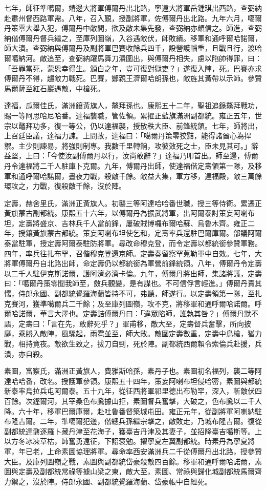 \begin{pinyinscope}
七年，師征準噶爾，靖邊大將軍傅爾丹出北路，寧遠大將軍岳鍾琪出西路，查弼納赴肅州督西路軍需。八年，召入覲，授副將軍，佐傅爾丹出北路。九年六月，噶爾丹策零大舉入犯，傅爾丹中敵間，欲及敵未集先發，查弼納亦頗信之。師進，查弼納偕傅爾丹督兵繼之，至庫列圖嶺，入谷遇敵伏，師敗績。移軍和通呼爾哈諾爾，師大潰。查弼納與傅爾丹及副將軍巴賽收餘兵四千，設營護輜重，且戰且行，渡哈爾噶納河。敵追至，查弼納躍馬舞刀潰圍出，與傅爾丹相失，慮以陷帥得罪，曰：「吾罪當死，蒙恩幸得生。頒白之年，豈可復對獄吏？」遂復入陣，死。巴賽亦求傅爾丹不得，趨敵力戰死。巴賽，鄭親王濟爾哈朗孫也，敵旌其黃帶以示師。參贊馬爾薩至紅石巖遇敵，中槍死。

達福，瓜爾佳氏，滿洲鑲黃旗人，鼇拜孫也。康熙五十二年，聖祖追錄鼇拜戰功，賜一等阿思哈尼哈番。達福襲職，管佐領。累擢正藍旗滿洲副都統。雍正五年，世宗以鼇拜功多，復一等公，仍以達福襲，授散秩大臣、前鋒統領。七年，師將出，上召廷臣議，達福力諫。上問故，達福曰：「噶爾丹策零狡黠，能得諸酋心為捍禦。主少則諫易，將強則制專。我數千里轉餉，攻彼效死之士，臣未見其可。」辭益堅，上曰：「今使汝副傅爾丹以行，汝尚敢辭？」達福乃叩首出。師至邊，傅爾丹令達福將二千人駐庫卜克爾。九年，傅爾丹出師，使達福偕定壽領第一隊，及移軍和通呼爾哈諾爾，晝夜力戰，殺敵千餘。敵益大集，軍方移，達福殿，敵三萬餘環攻之，力戰，復殺敵千餘，沒於陣。

定壽，赫舍里氏，滿洲正黃旗人。初襲三等阿達哈哈番世職，授三等侍衛。累遷正黃旗蒙古副都統。康熙五十六年，以傅爾丹為振武將軍，出阿爾泰討策妄阿喇布坦，定壽將盛京、吉林兵千人當前鋒，屢破賊博囉布爾哈蘇、烏魯木齊。雍正二年，授鑲黃旗蒙古都統。策妄阿喇布坦使乞和，定壽率兵還駐巴爾庫爾。部議阿爾泰當駐軍，授定壽阿爾泰駐防將軍。尋改命穆克登，而令定壽以都統銜參贊軍務。四年，率兵往扎布罕，召偕穆克登還京師。定壽奏留察罕蒐勒軍中自效。七年，大將軍傅爾丹自北路出師，命定壽仍以都統銜為軍營前鋒統領。八年，傅爾丹令定壽以二千人駐伊克斯諾爾，護阿濟必濟卡倫。九年，傅爾丹將出師，集諸將議，定壽曰：「噶爾丹策零聞我師至，斂兵觀變，是有謀也。不可信俘言輕進。」傅爾丹責其懦，侍郎永國、副都統覺羅海蘭皆持不可，弗聽，師遂行。以定壽領第一隊，至扎克賽河，獲準噶爾兵二千餘；及至庫列圖嶺，攻不克，將移軍和通呼爾哈諾爾。呼爾哈諾爾，華言大澤也。定壽詰傅爾丹曰：「違眾陷師，誰執其咎？」傅爾丹默不語，定壽曰：「言在先，敢辭死乎？」軍甫移，敵大至，定壽督兵奮擊，所向披靡，乘勝入敵陣，風驟起，雨雹並至，師大敗。敵圍定壽數重，定壽中鳥槍，猶力戰，相持竟夜。敵欲生致之，拔刀自剄，死於陣。副都統西爾賴令索倫兵赴援，兵潰，亦自殺。

素圖，富察氏，滿洲正黃旗人，費雅斯哈孫，素丹子也。素圖初名福列，襲二等阿達哈哈番，改名。授護軍參領。康熙五十四年，策妄阿喇布坦侵哈密，素圖與都統新泰率烏拉兵屯阿爾泰。五十九年，從征西將軍祁里德出布勒罕，深入，斬敵伏四百餘。次鏗爾河，其宰桑色布騰據山拒，素圖督兵奮擊，大破之，色布騰以二千人降。六十年，移軍巴爾庫爾，赴吐魯番督築城屯田。雍正元年，從副將軍阿喇納駐布隆吉爾。二年，準噶爾犯邊，偕總兵孫繼宗擊之，敵敗走，乃城布隆吉爾。復從副都統達鼐逐羅卜藏丹津至花海子，獲臺吉丹津及其妻子，並招降臺吉噶斯等。上以方冬冰凍草枯，師奮勇遠征，下詔褒勉。擢寧夏左翼副都統。時素丹為寧夏將軍，年已老，上命素圖協理將軍。尋命率西安滿洲兵二千從傅爾丹出北路，授參贊大臣。及庫列圖嶺之戰，素圖與副都統岱豪殺敵四百餘。移軍和通呼爾哈諾爾，素圖與定壽及副都統常祿等據山梁之東，敵大至，素圖、常祿與歸化城副都統馬爾齊力禦之，沒於陣。侍郎永國、副都統覺羅海蘭、岱豪帳中自經死。


\end{pinyinscope}
